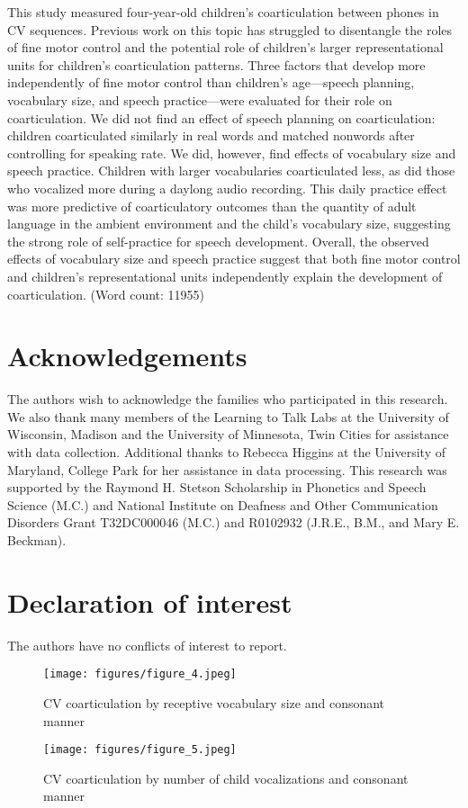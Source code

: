 \documentclass[a4paper,man,natbib,donotrepeattitle, apacite]{apa6}
\begin{document}
This study measured four-year-old children’s coarticulation between phones in CV sequences. Previous work on this topic has struggled to disentangle the roles of fine motor control and the potential role of children’s larger representational units for children’s coarticulation patterns. Three factors that develop more independently of fine motor control than children's age---speech planning, vocabulary size, and speech practice---were evaluated for their role on coarticulation. We did not find an effect of speech planning on coarticulation: children coarticulated similarly in real words and matched nonwords after controlling for speaking rate. We did, however, find effects of vocabulary size and speech practice. Children with larger vocabularies coarticulated less, as did those who vocalized more during a daylong audio recording. This daily practice effect was more predictive of coarticulatory outcomes than the quantity of adult language in the ambient environment and the child's vocabulary size, suggesting the strong role of self-practice for speech development. Overall, the observed effects of vocabulary size and speech practice suggest that both fine motor control and children's representational units independently explain the development of coarticulation. (Word count: 11955)

\section{Acknowledgements}

The authors wish to acknowledge the families who participated in this research. We also thank many members of the Learning to Talk Labs at the University of Wisconsin, Madison and the University of Minnesota, Twin Cities for assistance with data collection. Additional thanks to Rebecca Higgins at the University of Maryland, College Park for her assistance in data processing. This research was supported by the Raymond H. Stetson Scholarship in Phonetics and Speech Science (M.C.) and National Institute on Deafness and Other Communication Disorders Grant T32DC000046 (M.C.) and R0102932 (J.R.E., B.M., and Mary E. Beckman).   

\section{Declaration of interest}

The authors have no conflicts of interest to report. 





\begin{figure}[H]
\centering
\texttt{[image: figures/figure\_4.jpeg]}
\caption{\label{fig:figure-4}CV coarticulation by receptive vocabulary size and consonant manner}
\end{figure}

\begin{figure}[H]
\centering
\texttt{[image: figures/figure\_5.jpeg]}
\caption{\label{fig:figure-5}CV coarticulation by number of child vocalizations and consonant manner}
\end{figure}
\end{document}
